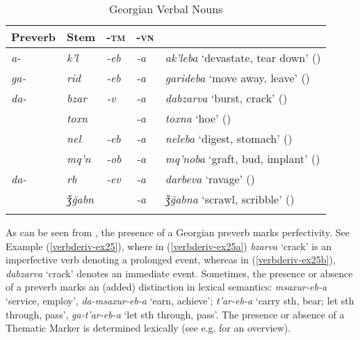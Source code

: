 \begin{table}
	\begin{tabular}{lllll}
    \lsptoprule
		Preverb & {Stem} & {-\textsc{tm}} & {\textsc{-vn}} & \\
        \midrule
		\textit{a-}	& \textit{k'l}  & \textit{-eb} & \textit{-a} & \textit{ak'leba} `devastate, tear down' ({\Pfv}) \\
		\textit{ga-}	& \textit{rid}  & \textit{-eb} & \textit{-a} &	\textit{garideba} `move away, leave' ({\Pfv})\\ 
		\textit{da-}	& \textit{bzar} & \textit{-v} & \textit{-a} &	\textit{dabzarva}  `burst, crack' ({\Pfv})\\
		& \textit{toxn} & & \textit{-a} &	\textit{toxna} `hoe'  ({\Ipfv})\\
		& \textit{nel} & \textit{-eb} & \textit{-a} &	\textit{neleba} `digest, stomach'  ({\Ipfv})\\ 
		& \textit{mq'n} & \textit{-ob} & \textit{-a} & \textit{mq'noba} `graft, bud, implant' ({\Ipfv})\\
		\textit{da-} & \textit{rb} & \textit{-ev} & \textit{-a} & \textit{darbeva}	`ravage' ({\Pfv}) \\
		& \textit{ǯ\u{g}abn}	& & \textit{-a} &	\textit{ǯ\u{g}abna} `scrawl, scribble'  ({\Ipfv})\\
        \lspbottomrule
	\end{tabular}
	\caption{Georgian Verbal Nouns}
	\label{table-georgianvn}
\end{table}

As can be seen from , the presence of a Georgian preverb marks perfectivity. See Example (\ref{verbderiv-ex25}), where in (\ref{verbderiv-ex25a}) \textit{bzarva} `crack' is an imperfective verb denoting a prolonged event, whereas in (\ref{verbderiv-ex25b}), \textit{dabzarva} `crack' denotes an immediate event. Sometimes, the presence or absence of a preverb marks an (added) distinction in lexical semantics: \textit{msaxur-eb-a} `service, employ', \textit{da-msaxur-eb-a} `earn, achieve'; \textit{t'ar-eb-a} `carry sth, bear; let sth through, pass', \textit{ga-t'ar-eb-a} `let sth through, pass'. The presence or absence of a Thematic Marker is determined lexically (see e.g. \textcite{hewitt95} for an overview).

